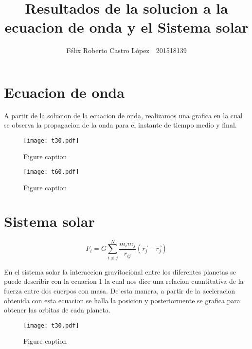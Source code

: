 \documentclass[12pt]{article}
\begin{document}
\title{Resultados de la solucion a la ecuacion de onda y el Sistema solar }

\author{Félix Roberto Castro López\ \ 201518139}


\section{Ecuacion de onda}

 A partir de la solucion de la ecuacion de onda, realizamos una grafica en la cual se observa la propagacion de la onda para el instante de tiempo medio y final.

\begin{figure}[h]
\centering\texttt{[image: t30.pdf]}
\caption{Figure caption}
\end{figure}

\item 
\begin{figure}[h]
\centering\texttt{[image: t60.pdf]}
\caption{Figure caption}
\end{figure}




\section{Sistema solar}
\begin{equation}

\label{eq:emc}
F_{i}=G \sum_{i\not\equiv j}^{N}\frac{m_{i}m_{j}}{r_{ij}}(\vec{r_{j}}-\vec{r_{j}}) 
\end{equation}

En el sistema solar la interaccion gravitacional entre los diferentes planetas se puede describir con la ecuacion 1 la cual nos dice una relacion cuantitativa de la fuerza entre dos cuerpos con masa. De esta manera, a partir de la aceleracion obtenida con esta ecuacion se halla la posicion y posteriormente se grafica para obtener las orbitas de cada planeta.  

\begin{figure}[h]
\centering\texttt{[image: t30.pdf]}
\caption{Figure caption}
\end{figure}
\end{document}
